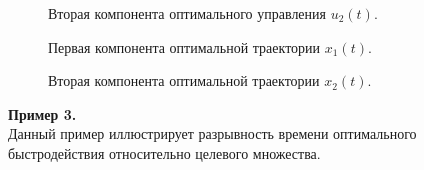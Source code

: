 \documentclass[10pt]{article}
\begin{document}
\begin{figure}[h]
	\caption*{Вторая компонента оптимального управления \( u_2(t) \).}
\end{figure}
\begin{figure}[h!]
	\caption*{Первая компонента оптимальной траектории \( x_1(t) \).}
\end{figure}
\newpage
\begin{figure}[h]
	\caption*{Вторая компонента оптимальной траектории \( x_2(t) \).}
\end{figure}
\noindent\textbf{Пример 3.}\smallskip\\
Данный пример иллюстрирует разрывность времени оптимального быстродействия относительно целевого множества. 
\end{document}
